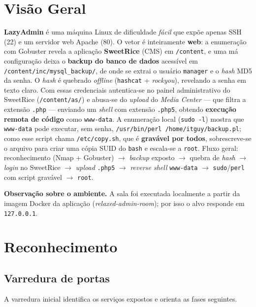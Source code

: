 \documentclass[12pt,a4paper]{article}
\newcommand{\cmd}[1]{\lstinline[style=shell]|#1|}
\begin{document}
\section{Visão Geral}
\textbf{LazyAdmin} é uma máquina Linux de dificuldade \emph{fácil} que expõe
apenas SSH (22) e um servidor web Apache (80). O vetor é inteiramente
\textbf{web}: a enumeração com Gobuster revela a aplicação \textbf{SweetRice}
(CMS) em \texttt{/content}, e uma má configuração deixa o \textbf{backup do banco
de dados} acessível em \texttt{/content/inc/mysql\_backup/}, de onde se extrai o
usuário \texttt{manager} e o \emph{hash} MD5 da senha. O \emph{hash} é quebrado
\emph{offline} (\texttt{hashcat} + \emph{rockyou}), revelando a senha em texto
claro. Com essas credenciais autentica-se no painel administrativo do SweetRice
(\texttt{/content/as/}) e abusa-se do \emph{upload} do \emph{Media Center} ---
que filtra a extensão \texttt{.php} --- enviando um \emph{shell} com extensão
\texttt{.php5}, obtendo \textbf{execução remota de código} como \texttt{www-data}.
A enumeração local (\cmd{sudo -l}) mostra que \texttt{www-data} pode executar,
sem senha, \cmd{/usr/bin/perl /home/itguy/backup.pl}; como esse script chama
\texttt{/etc/copy.sh}, que é \textbf{gravável por todos}, sobrescreve-se o arquivo
para criar uma cópia SUID do \texttt{bash} e escala-se a \texttt{root}. Fluxo
geral: reconhecimento (Nmap + Gobuster) $\rightarrow$ \emph{backup} exposto
$\rightarrow$ quebra de \emph{hash} $\rightarrow$ \emph{login} no SweetRice
$\rightarrow$ \emph{upload} \texttt{.php5} $\rightarrow$ \emph{reverse shell}
\texttt{www-data} $\rightarrow$ \texttt{sudo}/\texttt{perl} com script gravável
$\rightarrow$ \texttt{root}.

\medskip
\noindent\textbf{Observação sobre o ambiente.} A sala foi executada localmente a
partir da imagem Docker da aplicação (\emph{relaxed-admin-room}); por isso o alvo
responde em \texttt{127.0.0.1}.

\section{Reconhecimento}

\subsection{Varredura de portas}
A varredura inicial identifica os serviços expostos e orienta as fases seguintes.
\end{document}
